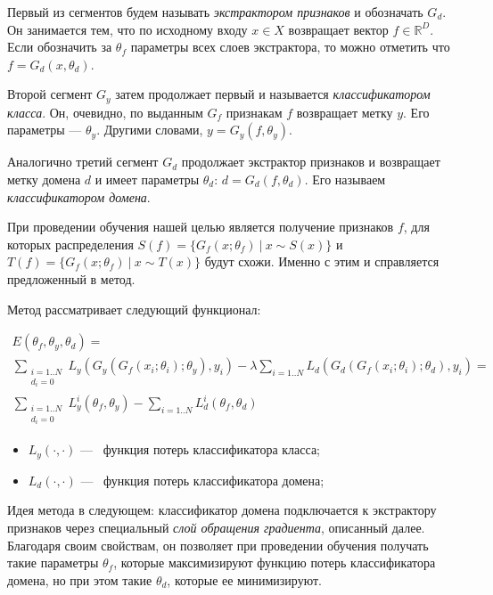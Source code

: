 \documentclass[14pt]{extarticle}
\begin{document}
Первый из сегментов будем называть \textit{экстрактором признаков} и обозначать $G_d$. Он занимается тем, что по исходному входу $x \in X$ возвращает вектор $f \in \mathbb{R}^D$. Если обозначить за $\theta_f$ параметры всех слоев экстрактора, то можно отметить что $f = G_d(x, \theta_d)$.
 
Второй сегмент $G_y$ затем продолжает первый и называется \textit{классификатором класса}. Он, очевидно, по выданным $G_f$ признакам $f$ возвращает метку $y$. Его параметры — $\theta_y$. Другими словами, $y = G_y(f, \theta_y)$.
 
Аналогично третий сегмент $G_d$ продолжает экстрактор признаков и возвращает метку домена $d$ и имеет параметры $\theta_d$: $d = G_d(f, \theta_d)$. Его называем \textit{классификатором домена}.
 
При проведении обучения нашей целью является получение признаков $f$, для которых распределения $S(f) = \{G_f(x; \theta_f)~|~x \sim S(x) \}$ и $T(f) = \{G_f(x; \theta_f)~|~x \sim T(x) \}$ будут схожи. Именно с этим и справляется предложенный в \cite{ganin} метод.

Метод рассматривает следующий функционал:

\begin{equation}\label{E}
\begin{gathered}
E(\theta_f, \theta_y, \theta_d) = \\ \sum_{ \substack{i=1..N \\ d_i=0} }L_y(G_y(G_f(x_i; \theta_i); \theta_y), y_i) - \lambda \sum_{ i=1..N } L_d(G_d(G_f(x_i; \theta_i); \theta_d), y_i) = \\\sum_{ \substack{i=1..N \\ d_i=0} } L_y^i(\theta_f, \theta_y) - \sum_{ i=1..N }  L_d^i(\theta_f, \theta_d)
\end{gathered}
\end{equation}
\begin{itemize}
\item $L_y(·, ·)$ —~ функция потерь классификатора класса;
\item $L_d(·, ·)$ —~ функция потерь классификатора домена;
\end{itemize}

Идея метода в следующем: классификатор домена подключается к экстрактору признаков через специальный \textit{слой обращения градиента}, описанный далее. Благодаря своим свойствам, он позволяет при проведении обучения получать такие параметры $\theta_f$, которые максимизируют функцию потерь классификатора домена, но при этом такие $\theta_d$, которые ее минимизируют.
\end{document}

